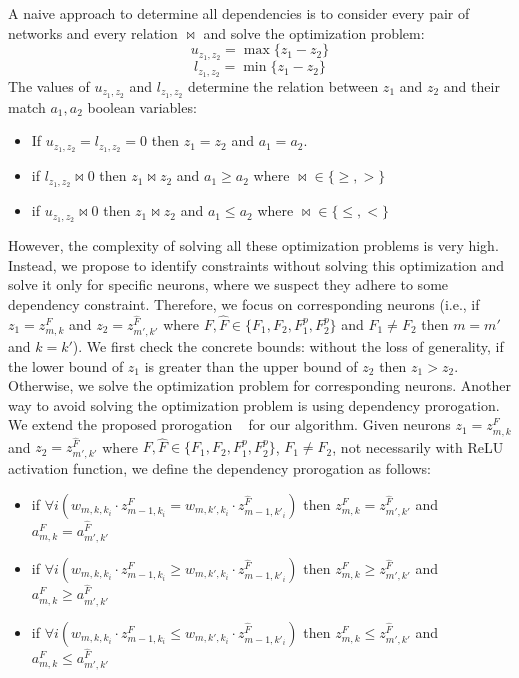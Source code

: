 A naive approach to determine all dependencies is to consider every pair of networks and every relation $\bowtie$ and solve the optimization problem: %
$$ u_{z_1,z_2}=\max{\{z_1-z_2\}} $$
$$ l_{z_1,z_2}=\min{\{z_1-z_2\}} $$
The values of $u_{z_1,z_2}$ and $l_{z_1,z_2}$ determine the relation between $z_1$ and $z_2$ and their match $a_1,a_2$ boolean variables:
\begin{itemize}
    \item If $u_{z_1,z_2}=l_{z_1,z_2}=0$ then $z_1=z_2$ and $a_1=a_2$.
    \item if $l_{z_1,z_2}\bowtie{0}$ then $z_1\bowtie{z_2}$ and $a_1\ge{a_2}$ where $\bowtie\in{\{\ge,>\}}$
    \item if $u_{z_1,z_2}\bowtie{0}$ then $z_1\bowtie{z_2}$ and $a_1\le{a_2}$ where $\bowtie\in{\{\le,<\}}$
\end{itemize}
However, the complexity of solving all these optimization problems is very high.
Instead, we propose to identify constraints without solving this optimization and solve it only for specific neurons, where we suspect they adhere to some dependency constraint. 
Therefore, we focus on corresponding neurons (i.e., if $z_1=z^F_{m,k}$ and $z_2=z^{\hat{F}}_{m',k'}$ where $F,\hat{F}\in{\{F_1,F_2,F^p_1,F^p_2\}}$ and $F_1\neq{F_2}$ then $m=m'$ and $k=k'$). We first check the concrete bounds: without the loss of generality, if the lower bound of $z_1$ is greater than the upper bound of $z_2$ then $z_1>z_2$. Otherwise, we solve the optimization problem for corresponding neurons. Another way to avoid solving the optimization problem is using dependency prorogation. We extend the proposed prorogation ~\cite{VHAGAR} for our algorithm. Given neurons $z_1=z^F_{m,k}$ and $z_2=z^{\hat{F}}_{m',k'}$ where $F,\hat{F}\in{\{F_1,F_2,F^p_1,F^p_2\}}$, $F_1\neq{F_2}$, not necessarily with ReLU activation function, we define the dependency prorogation as follows:

\begin{itemize}
    \item if $\forall{i} (w_{m,k,k_i}\cdot{z^F_{m-1,k_i}}=w_{m,k',k_i}\cdot{z^{\hat{F}}_{m-1,k'_i}})$ then $z^F_{m,k}=z^{\hat{F}}_{m',k'}$ and $a^F_{m,k}=a^{\hat{F}}_{m',k'}$
    \item if $\forall{i} (w_{m,k,k_i}\cdot{z^F_{m-1,k_i}}\ge{w_{m,k',k_i}\cdot{z^{\hat{F}}_{m-1,k'_i}}})$ then $z^F_{m,k}\ge{z^{\hat{F}}_{m',k'}}$ and $a^F_{m,k}\ge{a^{\hat{F}}_{m',k'}}$
    \item if $\forall{i} (w_{m,k,k_i}\cdot{z^F_{m-1,k_i}}\le{w_{m,k',k_i}\cdot{z^{\hat{F}}_{m-1,k'_i}}})$ then $z^F_{m,k}\le{z^{\hat{F}}_{m',k'}}$ and $a^F_{m,k}\le{a^{\hat{F}}_{m',k'}}$
\end{itemize}

